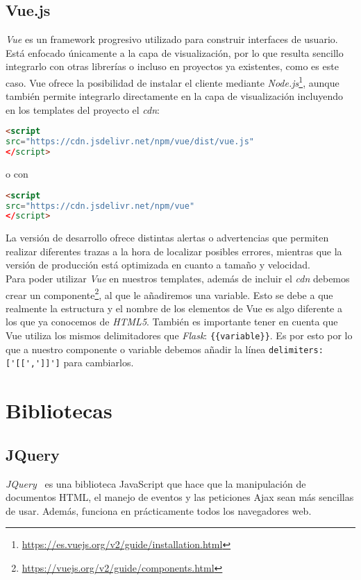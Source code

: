 \subsection{Vue.js}
\textit{Vue} es un framework progresivo utilizado para construir interfaces de usuario. Está enfocado únicamente a la capa de visualización, por lo que resulta sencillo integrarlo con otras librerías o incluso en proyectos ya existentes, como es este caso.
Vue ofrece la posibilidad de instalar el cliente mediante \textit{Node.js}\footnote{\url{https://es.vuejs.org/v2/guide/installation.html}}, aunque también permite integrarlo directamente en la capa de visualización incluyendo en los templates del proyecto el \textit{cdn}:

\renewcommand{\lstlistingname}{Vue.js cdn}%
\renewcommand{\lstlistlistingname}{List of \lstlistingname s}
\begin{lstlisting}[language=html,caption={Versión de desarrollo.}]
<script
src="https://cdn.jsdelivr.net/npm/vue/dist/vue.js"
</script>
\end{lstlisting}
o con
\begin{lstlisting}[language=html,caption={Versión de producción.}]
<script
src="https://cdn.jsdelivr.net/npm/vue"
</script>
\end{lstlisting}
La versión de desarrollo ofrece distintas alertas o advertencias que permiten realizar diferentes trazas a la hora de localizar posibles errores, mientras que la versión de producción está optimizada en cuanto a tamaño y velocidad.
\\
Para poder utilizar \textit{Vue} en nuestros templates, además de incluir el \textit{cdn} debemos crear un componente\footnote{\url{https://vuejs.org/v2/guide/components.html}}, al que le añadiremos una variable. Esto se debe a que realmente la estructura y el nombre de los elementos de Vue es algo diferente a los que ya conocemos de \textit{HTML5}. También es importante tener en cuenta que Vue utiliza los mismos delimitadores que \textit{Flask}: \verb|{{variable}}|. Es por esto por lo que a nuestro componente o variable debemos añadir la línea \verb|delimiters:['[[',']]']| para cambiarlos.


\section{Bibliotecas}

\subsection{JQuery}
\textit{JQuery}~\cite{doc:jquery} es una biblioteca JavaScript que hace que la manipulación de documentos HTML, el manejo de eventos y las peticiones Ajax sean más sencillas de usar. Además, funciona en prácticamente todos los navegadores web.

